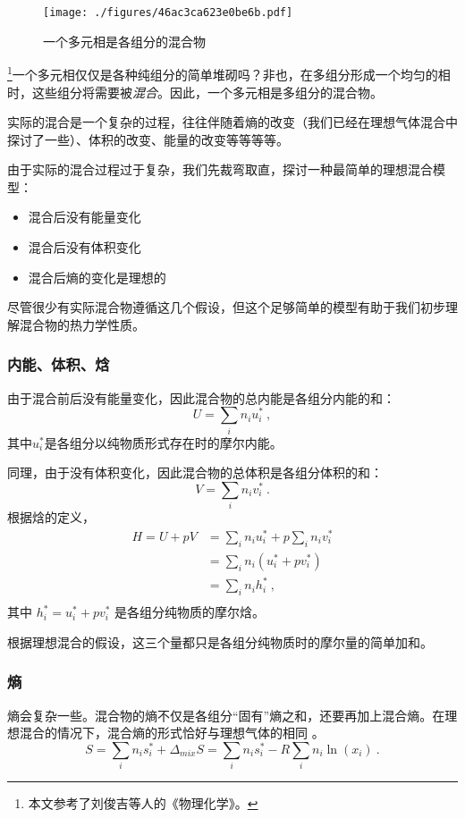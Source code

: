 

\begin{figure}[ht]
\centering
\texttt{[image: ./figures/46ac3ca623e0be6b.pdf]}
\caption{一个多元相是各组分的混合物} \label{fig_IMCPTV_1}
\end{figure}

\footnote{本文参考了刘俊吉等人的《物理化学》。}一个多元相仅仅是各种纯组分的简单堆砌吗？非也，在多组分形成一个均匀的相时，这些组分将需要被\textsl{混合}。因此，一个多元相是多组分的混合物。

实际的混合是一个复杂的过程，往往伴随着熵的改变（我们已经在理想气体混合中探讨了一些）、体积的改变、能量的改变等等等等。

由于实际的混合过程过于复杂，我们先裁弯取直，探讨一种最简单的理想混合模型：
\begin{itemize}
\item 混合后没有能量变化
\item 混合后没有体积变化
\item 混合后熵的变化是理想的
\end{itemize}
尽管很少有实际混合物遵循这几个假设，但这个足够简单的模型有助于我们初步理解混合物的热力学性质。

\subsubsection{内能、体积、焓}
由于混合前后没有能量变化，因此混合物的总内能是各组分内能的和：
$$
U = \sum_i n_i u_i^*~,
$$
其中$u_i^*$是各组分以纯物质形式存在时的摩尔内能。

同理，由于没有体积变化，因此混合物的总体积是各组分体积的和：
$$
V = \sum_i n_i v_i^*~.
$$
根据焓的定义，
$$
\begin{aligned}
H=U+pV&=\sum_i n_i u_i^*+p\sum_i n_i v_i^*\\
&=\sum_i n_i (u_i^*+p v_i^*)\\
&=\sum_i n_i h_i^*~,\\
\end{aligned}
$$
其中 $h^*_i = u_i^* + p v_i^*$ 是各组分纯物质的摩尔焓。

根据理想混合的假设，这三个量都只是各组分纯物质时的摩尔量的简单加和。

\subsubsection{熵}
熵会复杂一些。混合物的熵不仅是各组分“固有”熵之和，还要再加上混合熵。在理想混合的情况下，混合熵的形式恰好与理想气体的相同 。%
$$S = \sum_i n_i s_i^* + \Delta_{mix} S = \sum_i n_i s_i^* - R \sum_i n_i \ln (x_i)~. $$

